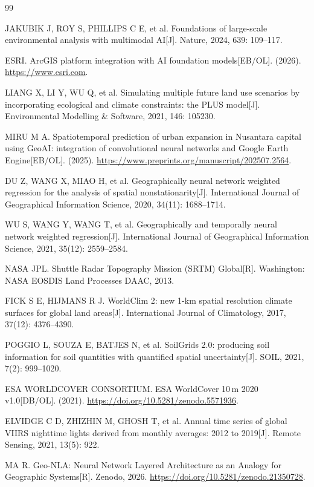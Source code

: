 \documentclass[11pt,a4paper]{article}
\begin{document}
\begin{thebibliography}{99}

JAKUBIK J, ROY S, PHILLIPS C E, et al.
\newblock Foundations of large-scale environmental analysis with multimodal AI[J].
\newblock Nature, 2024, 639: 109--117.

ESRI.
\newblock ArcGIS platform integration with AI foundation models[EB/OL].
\newblock (2026). \url{https://www.esri.com}.

LIANG X, LI Y, WU Q, et al.
\newblock Simulating multiple future land use scenarios by incorporating ecological and climate constraints: the PLUS model[J].
\newblock Environmental Modelling \& Software, 2021, 146: 105230.

MIRU M A.
\newblock Spatiotemporal prediction of urban expansion in Nusantara capital using GeoAI: integration of convolutional neural networks and Google Earth Engine[EB/OL].
\newblock (2025). \url{https://www.preprints.org/manuscript/202507.2564}.

DU Z, WANG X, MIAO H, et al.
\newblock Geographically neural network weighted regression for the analysis of spatial nonstationarity[J].
\newblock International Journal of Geographical Information Science, 2020, 34(11): 1688--1714.

WU S, WANG Y, WANG T, et al.
\newblock Geographically and temporally neural network weighted regression[J].
\newblock International Journal of Geographical Information Science, 2021, 35(12): 2559--2584.

NASA JPL.
\newblock Shuttle Radar Topography Mission (SRTM) Global[R].
\newblock Washington: NASA EOSDIS Land Processes DAAC, 2013.

FICK S E, HIJMANS R J.
\newblock WorldClim 2: new 1-km spatial resolution climate surfaces for global land areas[J].
\newblock International Journal of Climatology, 2017, 37(12): 4376--4390.

POGGIO L, SOUZA E, BATJES N, et al.
\newblock SoilGrids 2.0: producing soil information for soil quantities with quantified spatial uncertainty[J].
\newblock SOIL, 2021, 7(2): 999--1020.

ESA WORLDCOVER CONSORTIUM.
\newblock ESA WorldCover 10\,m 2020 v1.0[DB/OL].
\newblock (2021). \url{https://doi.org/10.5281/zenodo.5571936}.

ELVIDGE C D, ZHIZHIN M, GHOSH T, et al.
\newblock Annual time series of global VIIRS nighttime lights derived from monthly averages: 2012 to 2019[J].
\newblock Remote Sensing, 2021, 13(5): 922.

MA R.
\newblock Geo-NLA: Neural Network Layered Architecture as an Analogy for Geographic Systems[R].
\newblock Zenodo, 2026. \url{https://doi.org/10.5281/zenodo.21350728}.

\end{thebibliography}
\end{document}
